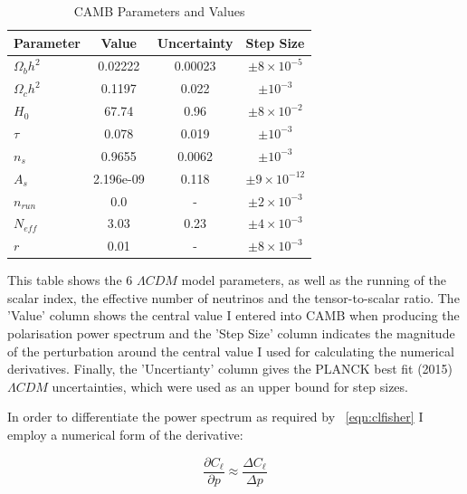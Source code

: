 \begin{table}[h]
\centering
\caption{CAMB Parameters and Values}
\label{table:camb}
\begin{tabular}{l|l|l|l}
Parameter & \multicolumn{1}{c|}{Value} & Uncertainty & Step Size \\ \hline
$\Omega_{b}h^{2}$ & \multicolumn{1}{c|}{0.02222} & \multicolumn{1}{c|}{0.00023} & \multicolumn{1}{c}{$\pm 8 \times 10^{-5}$}  \\
$\Omega_{c}h^{2}$ & \multicolumn{1}{c|}{0.1197} & \multicolumn{1}{c|}{0.022} & \multicolumn{1}{c}{$\pm 10^{-3}$}  \\
$H_0$ & \multicolumn{1}{c|}{67.74} & \multicolumn{1}{c|}{0.96} & \multicolumn{1}{c}{$\pm 8 \times 10^{-2}$}  \\
$\tau$ & \multicolumn{1}{c|}{0.078} & \multicolumn{1}{c|}{0.019} & \multicolumn{1}{c}{$\pm 10^{-3}$}  \\
$n_s$ & \multicolumn{1}{c|}{0.9655} & \multicolumn{1}{c|}{0.0062} & \multicolumn{1}{c}{$\pm 10^{-3}$}  \\
$A_s$ & \multicolumn{1}{c|}{2.196e-09} & \multicolumn{1}{c|}{0.118} & \multicolumn{1}{c}{$\pm 9 \times 10^{-12}$}  \\
$n_{run}$ & \multicolumn{1}{c|}{0.0} & \multicolumn{1}{c|}{-} & \multicolumn{1}{c}{$\pm 2 \times 10^{-3}$}  \\
$N_{eff}$ & \multicolumn{1}{c|}{3.03} & \multicolumn{1}{c|}{0.23} & \multicolumn{1}{c}{$\pm 4 \times 10^{-3}$}  \\
$r$ & \multicolumn{1}{c|}{0.01} & \multicolumn{1}{c|}{-} & \multicolumn{1}{c}{$\pm 8 \times 10^{-3}$} 
\end{tabular}

\bigskip
This table shows the 6 $\Lambda CDM$ model parameters, as well as the running of the scalar index, the effective number of neutrinos and the tensor-to-scalar ratio. The 'Value' column shows the central value I entered into CAMB when producing the polarisation power spectrum and the 'Step Size' column indicates the magnitude of the perturbation around the central value I used for calculating the numerical derivatives. Finally, the 'Uncertianty' column gives the PLANCK best fit (2015) \cite{Ade:2015xua} $\Lambda CDM$ uncertainties, which were used as an upper bound for step sizes.
\end{table}
 

In order to differentiate the power spectrum as required by ~\ref{eqn:clfisher} I employ a numerical form of the derivative:

\begin{equation}
\label{eqn:dcl}
\frac{\partial C_{\ell}}{\partial p} \approx \frac{\Delta C_{\ell}}{\Delta p}
\end{equation}
 
